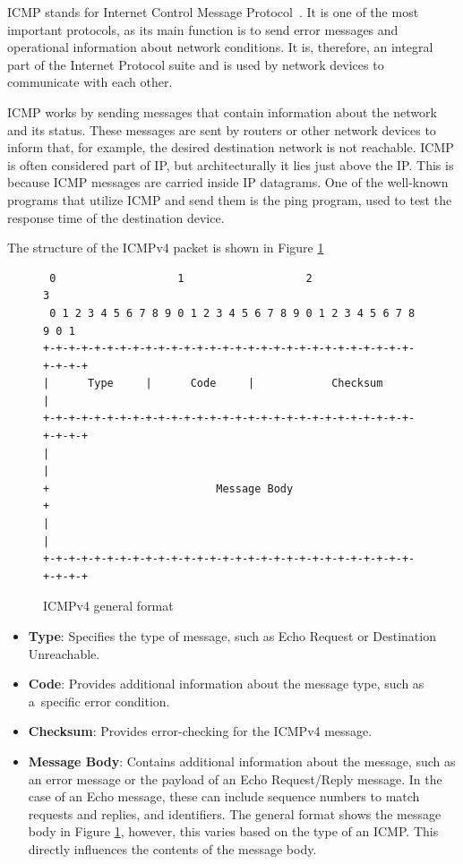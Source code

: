 \documentclass[
  printed,     %
  color,       %
  oneside,     %
  nosansbold,  %
  nocolorbold, %
  nolof,         %
  nolot,         %
]{fithesis4}
\begin{document}
ICMP stands for Internet Control Message Protocol~\cite{RFC0792}. It is one of the most important protocols, as its main function is to send error messages and operational information about network conditions. It is, therefore, an integral part of the Internet Protocol suite and is used by network devices to communicate with each other.

ICMP works by sending messages that contain information about the network and its status. These messages are sent by routers or other network devices to inform that, for example, the desired destination network is not reachable. ICMP is often considered part of IP, but architecturally it lies just above the IP. This is because ICMP messages are carried inside IP datagrams. One of the well-known programs that utilize ICMP and send them is the ping program, used to test the response time of the destination device.

The structure of the ICMPv4 packet is shown in Figure \ref{fig:icmp}

\begin{figure}[h]
\fontsize{10pt}{10pt}\selectfont
\begin{center}
\begin{BVerbatim}
 0                   1                   2                   3  
 0 1 2 3 4 5 6 7 8 9 0 1 2 3 4 5 6 7 8 9 0 1 2 3 4 5 6 7 8 9 0 1
+-+-+-+-+-+-+-+-+-+-+-+-+-+-+-+-+-+-+-+-+-+-+-+-+-+-+-+-+-+-+-+-+
|      Type     |      Code     |            Checksum           |
+-+-+-+-+-+-+-+-+-+-+-+-+-+-+-+-+-+-+-+-+-+-+-+-+-+-+-+-+-+-+-+-+
|                                                               |
+                          Message Body                         +
|                                                               |
+-+-+-+-+-+-+-+-+-+-+-+-+-+-+-+-+-+-+-+-+-+-+-+-+-+-+-+-+-+-+-+-+
\end{BVerbatim}
\end{center}
  \caption{ICMPv4 general format~\cite{RFC0792}}
  \label{fig:icmp}
\end{figure}

\begin{itemize}[noitemsep,topsep=0pt]
    \item \textbf{Type}: Specifies the type of message, such as Echo Request or Destination Unreachable.
    \item \textbf{Code}: Provides additional information about the message type, such as a~specific error condition.
    \item \textbf{Checksum}: Provides error-checking for the ICMPv4 message.
    \item \textbf{Message Body}: Contains additional information about the message, such as an error message or the payload of an Echo Request/Reply message. In the case of an Echo message, these can include sequence numbers to match requests and replies, and identifiers. The general format shows the message body in Figure \ref{fig:icmp}, however, this varies based on the type of an ICMP. This directly influences the contents of the message body.
    
\end{itemize}
\end{document}
